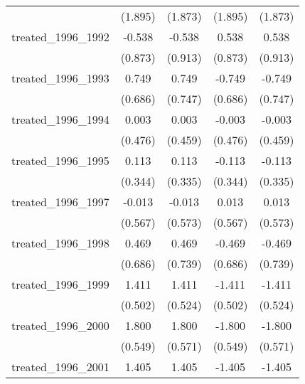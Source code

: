 {\begin{tabular}{l*{4}{c}}
            &     (1.895)         &     (1.873)         &     (1.895)         &     (1.873)         \\
[1em]
treated\_1996\_1992&      -0.538         &      -0.538         &       0.538         &       0.538         \\
            &     (0.873)         &     (0.913)         &     (0.873)         &     (0.913)         \\
[1em]
treated\_1996\_1993&       0.749         &       0.749         &      -0.749         &      -0.749         \\
            &     (0.686)         &     (0.747)         &     (0.686)         &     (0.747)         \\
[1em]
treated\_1996\_1994&       0.003         &       0.003         &      -0.003         &      -0.003         \\
            &     (0.476)         &     (0.459)         &     (0.476)         &     (0.459)         \\
[1em]
treated\_1996\_1995&       0.113         &       0.113         &      -0.113         &      -0.113         \\
            &     (0.344)         &     (0.335)         &     (0.344)         &     (0.335)         \\
[1em]
treated\_1996\_1997&      -0.013         &      -0.013         &       0.013         &       0.013         \\
            &     (0.567)         &     (0.573)         &     (0.567)         &     (0.573)         \\
[1em]
treated\_1996\_1998&       0.469         &       0.469         &      -0.469         &      -0.469         \\
            &     (0.686)         &     (0.739)         &     (0.686)         &     (0.739)         \\
[1em]
treated\_1996\_1999&       1.411\sym{**} &       1.411\sym{**} &      -1.411\sym{**} &      -1.411\sym{**} \\
            &     (0.502)         &     (0.524)         &     (0.502)         &     (0.524)         \\
[1em]
treated\_1996\_2000&       1.800\sym{**} &       1.800\sym{**} &      -1.800\sym{**} &      -1.800\sym{**} \\
            &     (0.549)         &     (0.571)         &     (0.549)         &     (0.571)         \\
[1em]
treated\_1996\_2001&       1.405\sym{**} &       1.405\sym{*}  &      -1.405\sym{**} &      -1.405\sym{*}  \\

\end{tabular}}

